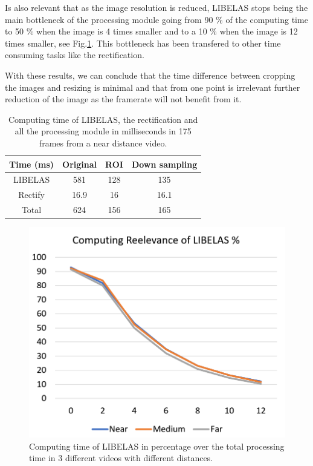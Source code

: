 \documentclass[10pt,a4paper,twocolumn,twoside]{article}
\begin{document}
	Is also relevant that as the image resolution is reduced, LIBELAS stops being the main bottleneck of the processing module going from 90 \% of the computing time to 50 \% when the image is 4 times smaller and to a 10 \% when the image is 12 times smaller, see Fig.\ref{fig:libelaspercentatge}. This bottleneck has been transfered to other time consuming tasks like the rectification.
	
	With these results, we can conclude that the time difference between cropping the images and resizing is minimal and that from one point is irrelevant further reduction of the image as the framerate will not benefit from it.  
	
	\begin{table}
		\centering
		\begin{tabular}{@{}cccc@{}}
			\toprule
			Time (ms) & Original & ROI & Down sampling \\ \midrule
			LIBELAS   & 581      & 128 & 135           \\
			Rectify   & 16.9     & 16  & 16.1          \\
			Total     & 624      & 156 & 165           \\ \bottomrule
		\end{tabular}
		\caption{Computing time of LIBELAS, the rectification and all the processing module in milliseconds in 175 frames from a near distance video.}
		\label{tab:timeprocess}
	\end{table}
	
	\begin{figure}
		\centering
		\includegraphics[width=1\linewidth]{img/ComputingLibelas.PNG}
		\caption{Computing time of LIBELAS in percentage over the total processing time in 3 different videos with different distances.}
		\label{fig:libelaspercentatge}
	\end{figure}
\end{document}
